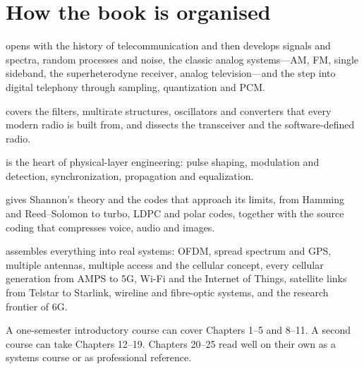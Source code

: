 \section*{How the book is organised}
\begin{description}[leftmargin=0pt]
\item[Part I, Foundations,] opens with the history of telecommunication and then develops
signals and spectra, random processes and noise, the classic analog systems---AM, FM,
single sideband, the superheterodyne receiver, analog television---and the step into
digital telephony through sampling, quantization and PCM.
\item[Part II, Digital Signal Processing for Radio,] covers the filters, multirate
structures, oscillators and converters that every modern radio is built from, and
dissects the transceiver and the software-defined radio.
\item[Part III, Digital Transmission,] is the heart of physical-layer engineering:
pulse shaping, modulation and detection, synchronization, propagation and equalization.
\item[Part IV, Information and Coding,] gives Shannon's theory and the codes that
approach its limits, from Hamming and Reed--Solomon to turbo, LDPC and polar codes,
together with the source coding that compresses voice, audio and images.
\item[Part V, Systems,] assembles everything into real systems: OFDM, spread spectrum and
GPS, multiple antennas, multiple access and the cellular concept, every cellular
generation from AMPS to 5G, Wi-Fi and the Internet of Things, satellite links from
Telstar to Starlink, wireline and fibre-optic systems, and the research frontier of 6G.
\end{description}

A one-semester introductory course can cover Chapters 1--5 and 8--11. A second course
can take Chapters 12--19. Chapters 20--25 read well on their own as a systems course or
as professional reference.

